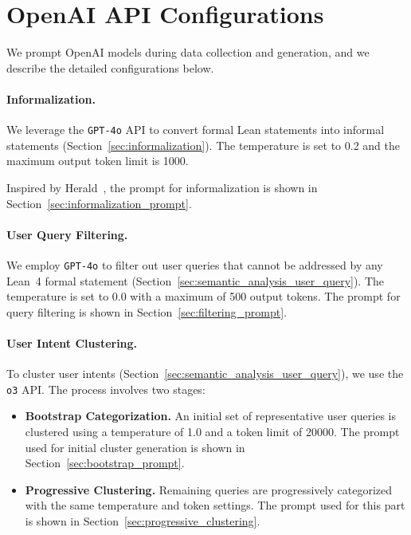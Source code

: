 \documentclass{article} %
\begin{document}
\section{OpenAI API Configurations}
\label{api_config}

We prompt OpenAI models during data collection and generation, and we describe the detailed configurations below.

\paragraph{Informalization.}
We leverage the \texttt{GPT-4o} API to convert formal Lean statements into informal statements (Section~\ref{sec:informalization}).
The temperature is set to 0.2 and the maximum output token limit is 1000.

Inspired by Herald~\cite{gao2024herald}, the prompt for informalization is shown in Section~\ref{sec:informalization_prompt}.


\paragraph{User Query Filtering.} We employ \texttt{GPT-4o} to filter out user queries that cannot be
addressed by any Lean~4 formal statement (Section~\ref{sec:semantic_analysis_user_query}).
The temperature is set to 0.0 with a maximum of 500 output tokens. The prompt for query filtering is shown in Section~\ref{sec:filtering_prompt}.


\paragraph{User Intent Clustering.}
To cluster user intents (Section~\ref{sec:semantic_analysis_user_query}), we use the \texttt{o3} API. The process involves two stages:

\begin{itemize}[leftmargin=2em]
    \item \textbf{Bootstrap Categorization.}
    An initial set of representative user queries is clustered using a temperature of 1.0 and a token limit of 20000. The prompt used for initial cluster generation is shown in Section~\ref{sec:bootstrap_prompt}.
    \item \textbf{Progressive Clustering.}
    Remaining queries are progressively categorized with the same temperature and token settings. The prompt used for this part is shown in Section~\ref{sec:progressive_clustering}.
\end{itemize}
\end{document}
